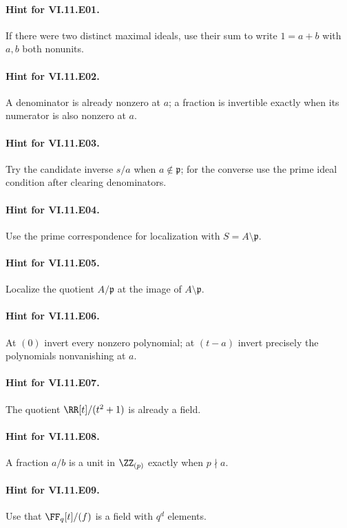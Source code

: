\paragraph{Hint for VI.11.E01.} If there were two distinct maximal ideals, use their sum to write $1=a+b$ with $a,b$ both nonunits.

\paragraph{Hint for VI.11.E02.} A denominator is already nonzero at $a$; a fraction is invertible exactly when its numerator is also nonzero at $a$.

\paragraph{Hint for VI.11.E03.} Try the candidate inverse $s/a$ when $a\notin\mathfrak p$; for the converse use the prime ideal condition after clearing denominators.

\paragraph{Hint for VI.11.E04.} Use the prime correspondence for localization with $S=A\setminus\mathfrak p$.

\paragraph{Hint for VI.11.E05.} Localize the quotient $A/\mathfrak p$ at the image of $A\setminus\mathfrak p$.

\paragraph{Hint for VI.11.E06.} At $(0)$ invert every nonzero polynomial; at $(t-a)$ invert precisely the polynomials nonvanishing at $a$.

\paragraph{Hint for VI.11.E07.} The quotient $\RR[t]/(t^2+1)$ is already a field.

\paragraph{Hint for VI.11.E08.} A fraction $a/b$ is a unit in $\ZZ_{(p)}$ exactly when $p\nmid a$.

\paragraph{Hint for VI.11.E09.} Use that $\FF_q[t]/(f)$ is a field with $q^d$ elements.

